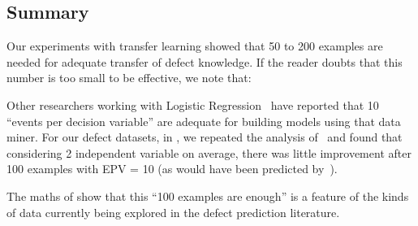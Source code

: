 \subsection{Summary}
Our experiments with transfer learning showed that 50 to 200 examples are needed for adequate
transfer of defect knowledge. If the reader doubts that this number is too small to be effective,
we note that:
\squishlist
\item Other researchers working with Logistic Regression~\cite{peduzzi1996simulation}
have reported that 10 ``events per decision variable'' are adequate for building models using that
data miner. For our defect datasets, in , we repeated the analysis of~\cite{peduzzi1996simulation}
and found that considering 2 independent variable on average, there was little improvement after 100 examples with EPV = 10 (as would have been predicted by~\cite{peduzzi1996simulation}).
\item The maths of  show that this ``100 examples are enough'' is a feature of the kinds of
data currently being explored in the defect prediction
literature.
\squishend
